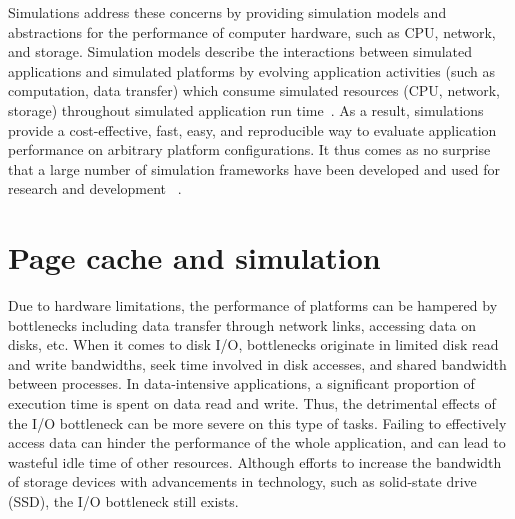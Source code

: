 Simulations address these concerns by providing simulation models and 
abstractions for the performance of computer hardware, such as CPU, 
network, and storage. 
Simulation models describe the interactions between simulated applications 
and simulated platforms by evolving application activities (such as computation, 
data transfer) which consume simulated resources (CPU, network, storage) 
throughout simulated application run time~\cite{casanova2014simgrid}. 
As a result, simulations provide a cost-effective, fast, easy, and reproducible 
way to evaluate application performance on arbitrary platform configurations. 
It thus comes as no surprise that a large number of simulation frameworks 
have been developed and used for research and development
~\cite{ optorsim, gridsim, groudsim, cloudsim, nunez2012simcan,
nunez2012icancloud, mdcsim, dissect_cf, cloudnetsimplusplus, 
fognetsimplusplus, casanova2014simgrid, ROSS, casanova2020fgcs}. 

\section{Page cache and simulation}

Due to hardware limitations, the performance of platforms can be hampered 
by bottlenecks including data transfer through network links, accessing data 
on disks, etc. 
When it comes to disk I/O, bottlenecks originate in limited 
disk read and write bandwidths, seek time involved in disk accesses, 
and shared bandwidth between processes. 
In data-intensive applications, a significant proportion of execution time 
is spent on data read and write.
Thus, the detrimental effects of the I/O bottleneck can be more severe on 
this type of tasks. 
Failing to effectively access data can hinder the performance of the 
whole application, and can lead to wasteful idle time of other resources. 
Although efforts to increase the bandwidth of storage devices with 
advancements in technology, such as solid-state drive (SSD), 
the I/O bottleneck still exists.


